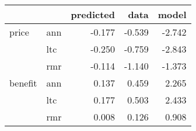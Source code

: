 \begin{tabular}{llrrr}
\toprule
        &     &  predicted &   data &  model \\
\midrule
price & ann &     -0.177 & -0.539 & -2.742 \\
        & ltc &     -0.250 & -0.759 & -2.843 \\
        & rmr &     -0.114 & -1.140 & -1.373 \\
benefit & ann &      0.137 &  0.459 &  2.265 \\
        & ltc &      0.177 &  0.503 &  2.433 \\
        & rmr &      0.008 &  0.126 &  0.908 \\
\bottomrule
\end{tabular}
